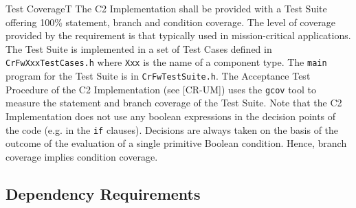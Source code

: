 \documentclass{pnp_article}
\begin{document}
\begin{fwReq}{Test Coverage}{T}
{The C2 Implementation shall be provided with a Test Suite offering 100\% statement, branch and condition coverage.}
{The level of coverage provided by the requirement is that typically used in mission-critical applications.}
{The Test Suite is implemented in a set of Test Cases defined in \texttt{CrFwXxxTestCases.h} where \texttt{Xxx} is the name of a component type. The \texttt{main} program for the Test Suite is in \texttt{CrFwTestSuite.h}.} 
{The Acceptance Test Procedure of the C2 Implementation (see [CR-UM]) uses the \texttt{gcov} tool to measure the statement and branch coverage of the Test Suite. Note that the C2 Implementation does not use any boolean expressions in the decision 
points of the code (e.g. in the \texttt{if} clauses). Decisions are always taken on the basis of the outcome of the evaluation of a single primitive Boolean condition. Hence, branch coverage implies condition coverage.  }
\end{fwReq}





\subsection{Dependency Requirements}\label{req:dependencyReqs}
\end{document}
